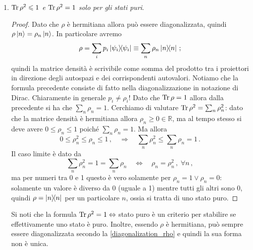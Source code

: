 \begin{enumerate}
    \item \textit{$\Tr \rho^2 \leqslant 1$ e $\Tr \rho^2 = 1$ solo per gli stati puri}.
    \begin{proof}
        Dato che $\rho$ è hermitiana allora può essere diagonalizzata, quindi $\rho \ket{n} = \rho_n \ket{n}$. In particolare avremo
        \begin{equation}\label{diagonalization_rho}
            \rho = \sum_i p_i \ketbra{\psi_i} \equiv \sum_n \rho_n \ketbra{n} \, ;
        \end{equation}
        quindi la matrice densità è scrivibile come somma del prodotto tra i proiettori in direzione degli autospazi e dei corrispondenti autovalori. Notiamo che la formula precedente consiste di fatto nella diagonalizzazione in notazione di Dirac. Chiaramente in generale $p_i \neq \rho_i$! Dato che $\Tr \rho = 1$ allora dalla precedente si ha che $\sum_n \rho_n = 1$. Cerchiamo di valutare $\Tr \rho^2 = \sum_n \rho_n^2$: dato che la matrice densità è hermitiana allora $\rho_n \geqslant 0 \in \mathbb{R}$, ma al tempo stesso si deve avere $0 \leqslant \rho_n \leqslant 1$ poiché $\sum_n \rho_n = 1$. Ma allora
        \begin{equation*}
            0 \leqslant \rho_n^2 \leqslant \rho_n \leqslant 1 \, , \quad \Rightarrow \quad \sum_n \rho_n^2 \leqslant \sum_n \rho_n = 1 \, .
        \end{equation*}
        Il caso limite è dato da
        \begin{equation*}
            \sum_n \rho_n^2 = 1 = \sum_n \rho_n \quad \Leftrightarrow \quad \rho_n = \rho_n^2 \, , \; \forall n \, ,
        \end{equation*}
        ma per numeri tra 0 e 1 questo è vero solamente per $\rho_n = 1 \lor \rho_n = 0$: solamente un valore è diverso da 0 (uguale a 1) mentre tutti gli altri sono 0, quindi $\rho = \ketbra{n}$ per un particolare $n$, ossia si tratta di uno stato puro. 
    \end{proof}
    Si noti che la formula $\Tr \rho^2 = 1 \Leftrightarrow $ stato puro è un criterio per stabilire se effettivamente uno stato è puro. Inoltre, essendo $\rho$ è hermitiana, può sempre essere diagonalizzata secondo la \eqref{diagonalization_rho} e quindi la sua forma non è unica.
\end{enumerate}

